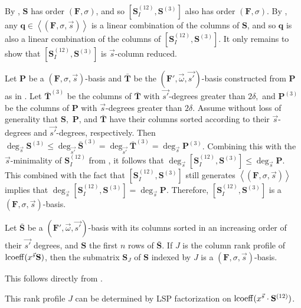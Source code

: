 \begin{pf}
By , $\mathbf{S}$ has order $\left(\mathbf{F},\sigma\right)$,
and so $[\mathbf{S}_{I}^{\left(12\right)},\mathbf{S}^{\left(3\right)}]$
also has order $\left(\mathbf{F},\sigma\right)$. By ,
any $\mathbf{q}\in\left\langle \left(\mathbf{F},\sigma,\vec{s}\right)\right\rangle $
is a linear combination of the columns of $\mathbf{S}$, and so $\mathbf{q}$
is also a linear combination of the columns of $[\mathbf{S}_{I}^{\left(12\right)},\mathbf{S}^{\left(3\right)}]$.
It only remains to show that $[\mathbf{S}_{I}^{\left(12\right)},\mathbf{S}^{\left(3\right)}]$
is $\vec{s}$-column reduced.

Let $\mathbf{P}$ be a $\left(\mathbf{F},\sigma,\vec{s}\right)$-basis
and $\mathbf{\bar{\mathbf{T}}}$ be the $(\mathbf{F}',\vec{\omega},\vec{s'})$-basis
constructed from $\mathbf{P}$ as in . Let
$\bar{\mathbf{T}}^{\left(3\right)}$ be the columns of $\bar{\mathbf{T}}$
with $\vec{s'}$-degrees greater than $2\delta,$ and $\mathbf{P}^{\left(3\right)}$
be the columns of $\mathbf{P}$ with $\vec{s}$-degrees greater than
$2\delta.$ Assume without loss of generality that $\mathbf{S},$
$\mathbf{P}$, and $\bar{\mathbf{T}}$ have their columns sorted according
to their $\vec{s}$-degrees and $\vec{s'}$-degrees, respectively.
Then $\deg_{\vec{s}}\mathbf{S}^{\left(3\right)}\le\deg_{\vec{s'}}\bar{\mathbf{S}}^{\left(3\right)}=\deg_{\vec{s'}}\bar{\mathbf{T}}^{\left(3\right)}=\deg_{\vec{s}}\mathbf{P}^{\left(3\right)}$.
Combining this with the $\vec{s}$-minimality of $\mathbf{S}_{I}^{\left(12\right)}$
from , it follows that $\deg_{\vec{s}}[\mathbf{S}_{I}^{\left(12\right)},\mathbf{S}^{\left(3\right)}]\le\deg_{\vec{s}}\mathbf{P}$.
This combined with the fact that $[\mathbf{S}_{I}^{\left(12\right)},\mathbf{S}^{\left(3\right)}]$
still generates $\left\langle \left(\mathbf{F},\sigma,\vec{s}\right)\right\rangle $
implies that $\deg_{\vec{s}}[\mathbf{S}_{I}^{\left(12\right)},\mathbf{S}^{\left(3\right)}]=\deg_{\vec{s}}\mathbf{P}$.
Therefore, $[\mathbf{S}_{I}^{\left(12\right)},\mathbf{S}^{\left(3\right)}]$
is a $\left(\mathbf{F},\sigma,\vec{s}\right)$-basis. \end{pf}
\begin{cor}
\label{cor:extractingFbasisFromGbasis}Let $\bar{\mathbf{S}}$ be
a $(\mathbf{F}',\vec{\omega},\vec{s'})$-basis with its columns sorted
in an increasing order of their $\vec{s'}$ degrees, and $\mathbf{S}$
the first $n$ rows of $\bar{\mathbf{S}}$. If $J$ is the column
rank profile of $\operatorname{lcoeff}(x^{\vec{s}}\mathbf{S})$, then the submatrix
$\mathbf{S}_{J}$ of $\mathbf{S}$ indexed by $J$ is a $\left(\mathbf{F},\sigma,\vec{s}\right)$-basis.\end{cor}
\begin{pf}
This follows directly from . 
\end{pf}
This rank profile $J$ can be determined by LSP factorization on $\operatorname{lcoeff}(x^{\vec{s}}\cdot\mathbf{S}^{\left(12\right)})$.

